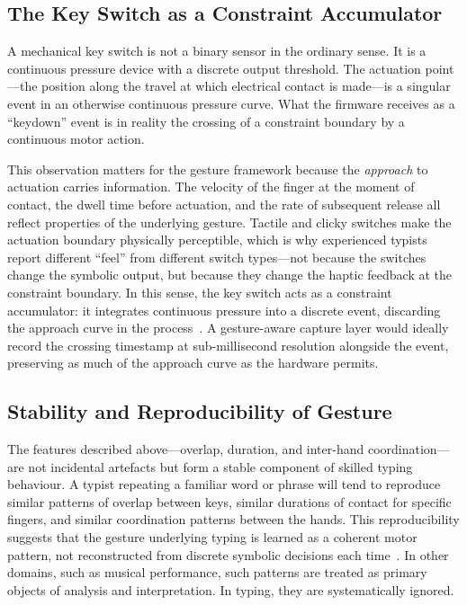 \documentclass[11pt, a4paper]{article}
\begin{document}
\subsection{The Key Switch as a Constraint Accumulator}

A mechanical key switch is not a binary sensor in the ordinary sense. It
is a continuous pressure device with a discrete output threshold. The
actuation point---the position along the travel at which electrical
contact is made---is a singular event in an otherwise continuous
pressure curve. What the firmware receives as a ``keydown'' event is in
reality the crossing of a constraint boundary by a continuous motor
action.

This observation matters for the gesture framework because the
\emph{approach} to actuation carries information. The velocity of the
finger at the moment of contact, the dwell time before actuation, and
the rate of subsequent release all reflect properties of the underlying
gesture. Tactile and clicky switches make the actuation boundary
physically perceptible, which is why experienced typists report different
``feel'' from different switch types---not because the switches change
the symbolic output, but because they change the haptic feedback at the
constraint boundary. In this sense, the key switch acts as a
constraint accumulator: it integrates continuous pressure into a
discrete event, discarding the approach curve in the
process~\cite{juarrero1999}. A
gesture-aware capture layer would ideally record the crossing timestamp
at sub-millisecond resolution alongside the event, preserving as much
of the approach curve as the hardware permits.

\subsection{Stability and Reproducibility of Gesture}

The features described above---overlap, duration, and inter-hand
coordination---are not incidental artefacts but form a stable component
of skilled typing behaviour. A typist repeating a familiar word or phrase
will tend to reproduce similar patterns of overlap between keys, similar
durations of contact for specific fingers, and similar coordination
patterns between the hands. This reproducibility suggests that the
gesture underlying typing is learned as a coherent motor pattern, not
reconstructed from discrete symbolic decisions each time~\cite{lashley1951}.
In other domains, such as musical performance, such patterns are treated
as primary objects of analysis and interpretation. In typing, they are
systematically ignored.
\end{document}
